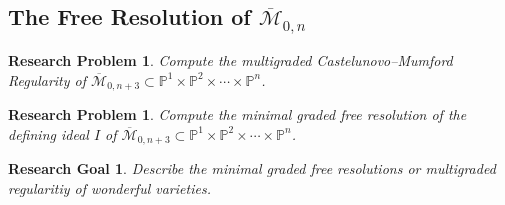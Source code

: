 \documentclass[11pt,reqno]{amsart}
\newtheorem{goal}[lemma]{Research Goal}
\newtheorem{problem}[lemma]{Research Problem}
\theoremstyle{remark}
\newcommand{\PP}{\mathbb{P}}
\newcommand{\cM}{\mathcal{M}}
\begin{document}
  
\subsection{The Free Resolution of $\overline{\cM}_{0,n}$}

\begin{problem}
 	Compute the multigraded Castelunovo--Mumford Regularity of $\overline{\cM}_{0,n+3} \subset \PP^{1}\times \PP^{2}\times \cdots \times \PP^{n}$.
\end{problem}

\begin{problem}
 	Compute the minimal graded free resolution of the defining ideal $I$ of  $\overline{\cM}_{0,n+3} \subset \PP^{1}\times \PP^{2}\times \cdots \times \PP^{n}$.
\end{problem}

\begin{goal}
	Describe the minimal graded free resolutions or multigraded regularitiy of wonderful varieties.
\end{goal}

\newpage
\renewcommand{\bibliofont}{\normalsize}



\end{document}
